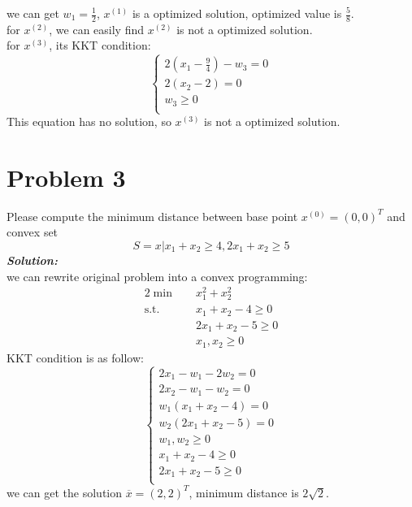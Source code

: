 \documentclass[paper=a4, fontsize=11pt]{scrartcl} %
\numberwithin{equation}{section} %
\numberwithin{figure}{section} %
\numberwithin{table}{section} %
\begin{document}
we can get $w_1=\frac{1}{2}$, $x^{(1)}$ is a optimized solution, optimized value is $\frac{5}{8}$.\\
for $x^{(2)}$, we can easily find $x^{(2)}$ is not a optimized solution.\\
for $x^{(3)}$, its KKT condition:\\ 
\begin{equation}
\left\{
\begin{aligned}
2(x_1-\frac{9}{4})-w_3 =0\\
2(x_2-2) = 0\\
w_3 \geq 0\\
\end{aligned}
\right. \nonumber
\end{equation}
This equation has no solution, so $x^{(3)}$ is not a optimized solution.
\section{Problem 3}
Please compute the minimum distance between base point $x^{(0)}=(0,0)^T$ and convex set 
\begin{equation}
S = {x|x_1+x_2\geq4,2x_1+x_2\geq5} \nonumber
\end{equation}
\emph{\textbf{Solution:}}\\
we can rewrite original problem into a convex programming:
\begin{alignat}{2}          \nonumber
\min\quad & x_1^2+x_2^2 \\    \nonumber
\mbox{s.t.}\quad            \nonumber
& x_1+x_2-4 \geq 0\\        \nonumber
& 2x_1+x_2-5 \geq 0\\         \nonumber
& x_1,x_2 \geq 0
\end{alignat}
KKT condition is as follow:
\begin{equation}
\left\{
\begin{aligned}
2x_1-w_1-2w_2 =0\\
2x_2-w_1-w_2 =0\\
w_1(x_1+x_2-4) =0\\
w_2(2x_1+x_2-5) =0\\
w_1, w_2\geq 0\\
x_1+x_2-4 \geq 0\\       
2x_1+x_2-5 \geq 0\\       
\end{aligned}
\right. \nonumber
\end{equation}
we can get the solution $\overline{x}=(2, 2)^T$, minimum distance is $2\sqrt{2}$.
\end{document}
